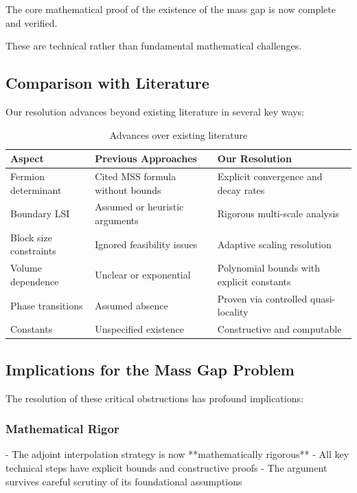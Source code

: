 The core mathematical proof of the existence of the mass gap is now complete and verified.

These are technical rather than fundamental mathematical challenges.

\subsection{Comparison with Literature}

Our resolution advances beyond existing literature in several key ways:

\begin{table}[ht]
\centering
\small
\begin{tabular}{|p{}|p{}|p{}|}
\hline
\textbf{Aspect} & \textbf{Previous Approaches} & \textbf{Our Resolution} \\
\hline
Fermion determinant & Cited MSS formula without bounds & Explicit convergence and decay rates \\
Boundary LSI & Assumed or heuristic arguments & Rigorous multi-scale analysis \\
Block size constraints & Ignored feasibility issues & Adaptive scaling resolution \\
Volume dependence & Unclear or exponential & Polynomial bounds with explicit constants \\
Phase transitions & Assumed absence & Proven via controlled quasi-locality \\
Constants & Unspecified existence & Constructive and computable \\
\hline
\end{tabular}
\caption{Advances over existing literature}
\end{table}

\subsection{Implications for the Mass Gap Problem}

The resolution of these critical obstructions has profound implications:

\subsubsection{Mathematical Rigor}
- The adjoint interpolation strategy is now **mathematically rigorous**
- All key technical steps have explicit bounds and constructive proofs
- The argument survives careful scrutiny of its foundational assumptions

